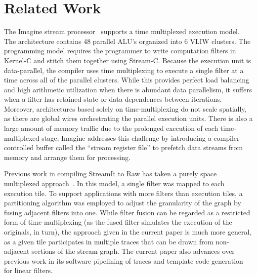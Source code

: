 \section{Related Work}
\label{sec:related}

The Imagine stream processor~\cite{rixner98bandwidthefficient}
supports a time multiplexed execution model.  The architecture
contains 48 parallel ALU's organized into 6 VLIW clusters.  The
programming model requires the programmer to write computation filters
in Kernel-C and stitch them together using Stream-C.  Because the
execution unit is data-parallel, the compiler uses time multiplexing
to execute a single filter at a time across all of the parallel
clusters.  While this provides perfect load balancing and high
arithmetic utilization when there is abundant data parallelism, it
suffers when a filter has retained state or data-dependences between
iterations.  Moreover, architectures based solely on
time-multiplexing do not scale spatially, as there are global wires
orchestrating the parallel execution units.  There is also a large
amount of memory traffic due to the prolonged execution of each
time-multiplexed stage; Imagine addresses this challenge by
introducing a compiler-controlled buffer called the ``stream register
file'' to prefetch data streams from memory and arrange them for
processing.

Previous work in compiling StreamIt to Raw has taken a purely space
multiplexed approach~\cite{streamit-asplos}.  In this model, a single
filter was mapped to each execution tile.  To support applications
with more filters than execution tiles, a partitioning algorithm was
employed to adjust the granularity of the graph by fusing adjacent
filters into one.  While filter fusion can be regarded as a restricted
form of time multiplexing (as the fused filter simulates the execution
of the originals, in turn), the approach given in the current paper is
much more general, as a given tile participates in multiple traces
that can be drawn from non-adjacent sections of the stream graph.  The
current paper also advances over previous work in its software
pipelining of traces and template code generation for linear filters.



